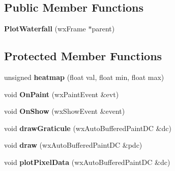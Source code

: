 \subsection*{Public Member Functions}
\begin{DoxyCompactItemize}
\item 
\hypertarget{class_plot_waterfall_ab8cb1de06d17616f05ab872923563167}{{\bfseries Plot\-Waterfall} (wx\-Frame $\ast$parent)}\label{class_plot_waterfall_ab8cb1de06d17616f05ab872923563167}

\end{DoxyCompactItemize}
\subsection*{Protected Member Functions}
\begin{DoxyCompactItemize}
\item 
\hypertarget{class_plot_waterfall_a9258386bf42d94ddda768e4e767a77aa}{unsigned {\bfseries heatmap} (float val, float min, float max)}\label{class_plot_waterfall_a9258386bf42d94ddda768e4e767a77aa}

\item 
\hypertarget{class_plot_waterfall_a37d541349ac6f010a90fee3b9f32fbbb}{void {\bfseries On\-Paint} (wx\-Paint\-Event \&evt)}\label{class_plot_waterfall_a37d541349ac6f010a90fee3b9f32fbbb}

\item 
\hypertarget{class_plot_waterfall_ad55e0e3078f0d5c3699df36ba6d8ab5d}{void {\bfseries On\-Show} (wx\-Show\-Event \&event)}\label{class_plot_waterfall_ad55e0e3078f0d5c3699df36ba6d8ab5d}

\item 
\hypertarget{class_plot_waterfall_aa97d243b7bb91238b7493dcb96139803}{void {\bfseries draw\-Graticule} (wx\-Auto\-Buffered\-Paint\-D\-C \&dc)}\label{class_plot_waterfall_aa97d243b7bb91238b7493dcb96139803}

\item 
\hypertarget{class_plot_waterfall_a86c6b3a9dc720b681f7b4e47d1fe193d}{void {\bfseries draw} (wx\-Auto\-Buffered\-Paint\-D\-C \&pdc)}\label{class_plot_waterfall_a86c6b3a9dc720b681f7b4e47d1fe193d}

\item 
\hypertarget{class_plot_waterfall_aec560c10f32a6c6e92a62225288c28f3}{void {\bfseries plot\-Pixel\-Data} (wx\-Auto\-Buffered\-Paint\-D\-C \&dc)}\label{class_plot_waterfall_aec560c10f32a6c6e92a62225288c28f3}

\end{DoxyCompactItemize}
